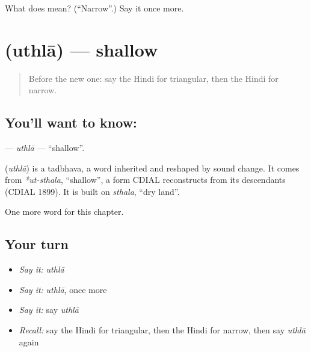 \begin{tcolorbox}[breakable,colback=teal!4,colframe=teal!35!black,title={Before you move on}]
What does  mean? (\textquotedblleft{}Narrow\textquotedblright{}.) Say it once more.
\end{tcolorbox}
\section[\texorpdfstring{\hi{उथला} (uthlā)}{उथला (uthlā)}]{ (uthlā) — shallow}

\label{lesson:HI-C237-uthla}



\begin{quote}
Before the new one: say the Hindi for triangular, then the Hindi for narrow.
\end{quote}

\subsection*{You'll want to know: }
\textbf{} — \emph{uthlā} — \textquotedblleft{}shallow\textquotedblright{}.

\begin{cousinweb}
\textbf{} (\emph{uthlā}) is a tadbhava, a word inherited and reshaped by sound change. It comes from \emph{*ut-sthala}, \textquotedblleft{}shallow\textquotedblright{}, a form CDIAL reconstructs from its descendants (CDIAL 1899). It is built on \emph{sthala}, \textquotedblleft{}dry land\textquotedblright{}.
\end{cousinweb}

\begin{grammarlens}[title={What you've built}]
One more word for this chapter.
\end{grammarlens}

\subsection*{Your turn}
\begin{itemize}
\raggedright
  \item \emph{Say it:} \emph{uthlā}
  \item \emph{Say it:} \emph{uthlā}, once more
  \item \emph{Say it:} say \emph{uthlā}
  \item \emph{Recall:} say the Hindi for triangular, then the Hindi for narrow, then say \emph{uthlā} again
\end{itemize}

